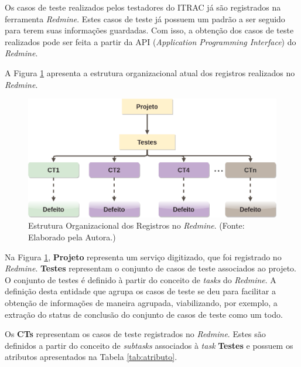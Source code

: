 Os casos de teste realizados pelos testadores do ITRAC já são registrados na ferramenta \textit{Redmine}. Estes casos de teste já possuem um padrão a ser seguido para terem suas informações guardadas. Com isso, a obtenção dos casos de teste realizados pode ser feita a partir da API (\textit{Application Programming Interface}) do \textit{Redmine}. 

A Figura \ref{fig:registro} apresenta a estrutura organizacional atual dos registros realizados no \textit{Redmine}. 


        \begin{figure}[h]
          \centering
          \includegraphics[width=15cm]{figuras/registro.png}
          \caption{Estrutura Organizacional dos Registros no \textit{Redmine}. (Fonte: Elaborado pela Autora.)} 
          \label{fig:registro}
        
        \end{figure}		

Na Figura \ref{fig:registro}, \textbf{Projeto} representa um serviço digitizado, que foi registrado no \textit{Redmine}. \textbf{Testes} representam o conjunto de casos de teste associados ao projeto. O conjunto de testes é definido à partir do conceito de \textit{tasks} do \textit{Redmine}. A definição desta entidade que agrupa os casos de teste se deu para facilitar a obtenção de informações de maneira agrupada, viabilizando, por exemplo, a extração do status de conclusão do conjunto de casos de teste como um todo.

Os \textbf{CTs} representam os casos de teste registrados no \textit{Redmine}. Estes são definidos a partir do conceito de \textit{subtasks} associados à \textit{task} \textbf{Testes} e possuem os atributos apresentados na Tabela \ref{tab:atributo}.

